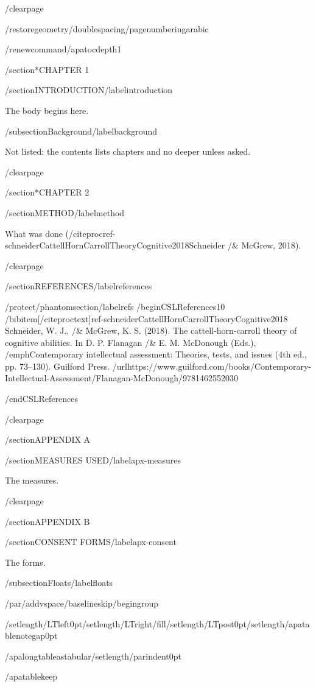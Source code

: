 /clearpage

/restoregeometry/doublespacing/pagenumbering{arabic}

/renewcommand{/apatocdepth}{1}

/section*{CHAPTER 1}

/section{INTRODUCTION}/label{introduction}

The body begins here.

/subsection{Background}/label{background}

Not listed: the contents lists chapters and no deeper unless asked.

/clearpage

/section*{CHAPTER 2}

/section{METHOD}/label{method}

What was done
(/citeproc{ref-schneiderCattellHornCarrollTheoryCognitive2018}{Schneider
/& McGrew, 2018}).

/clearpage

/section{REFERENCES}/label{references}

/protect/phantomsection/label{refs}
/begin{CSLReferences}{1}{0}
/bibitem[/citeproctext]{ref-schneiderCattellHornCarrollTheoryCognitive2018}
Schneider, W. J., /& McGrew, K. S. (2018). The cattell-horn-carroll
theory of cognitive abilities. In D. P. Flanagan /& E. M. McDonough
(Eds.), /emph{Contemporary intellectual assessment: Theories, tests, and
issues} (4th ed., pp. 73--130). Guilford Press.
/url{https://www.guilford.com/books/Contemporary-Intellectual-Assessment/Flanagan-McDonough/9781462552030}

/end{CSLReferences}

/clearpage

/section{APPENDIX A}

/section{MEASURES USED}/label{apx-measures}

The measures.

/clearpage

/section{APPENDIX B}

/section{CONSENT FORMS}/label{apx-consent}

The forms.

/subsection{Floats}/label{floats}

/par/addvspace{/baselineskip}/begingroup

/setlength{/LTleft}{0pt}/setlength{/LTright}{/fill}/setlength{/LTpost}{0pt}/setlength{/apatablenotegap}{0pt}

/apalongtableastabular/setlength{/parindent}{0pt}

/apatablekeep

